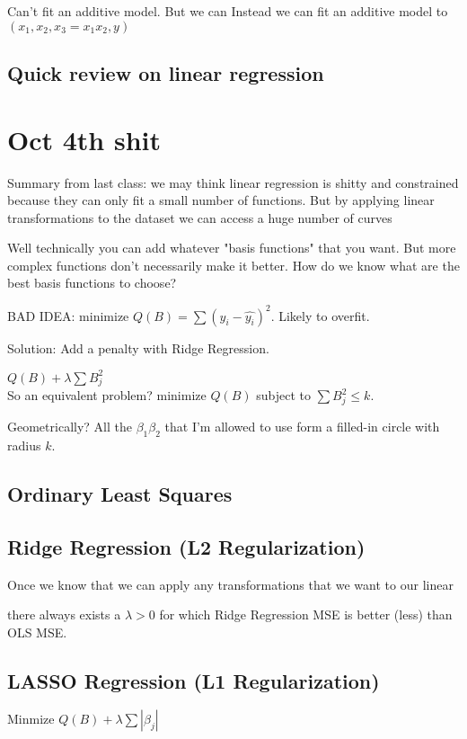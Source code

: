 \documentclass[12pt]{article}
\begin{document}
Can't fit an additive model. But we can Instead we can fit an additive model to $(x_1,x_2,x_3=x_1x_2, y)$

\subsection{Quick review on linear regression}

\section{Oct 4th shit}
Summary from last class: we may think linear regression is shitty and constrained because they can only fit a small number of functions. But by applying linear transformations to the dataset we can access a huge number of curves

Well technically you can add whatever "basis functions" that you want. But more complex functions don't necessarily make it better. How do we know what are the best basis functions to choose?

BAD IDEA: minimize $Q(B) = \sum (y_i-\hat{y_i})^2 $. Likely to overfit.

Solution: Add a penalty with Ridge Regression.

$Q(B) + \lambda \sum B_j^2$ \\

So an equivalent problem? minimize $Q(B)$ subject to $\sum B_j^2 \leq k$.

Geometrically? All the $\beta_1 \beta_2$ that I'm allowed to use form a filled-in circle with radius $k$.

\subsection{Ordinary Least Squares}

\subsection{Ridge Regression (L2 Regularization)}
Once we know that we can apply any transformations that we want to our linear 

there always exists a $\lambda > 0$ for which Ridge Regression MSE is better (less) than OLS MSE.

\subsection{LASSO Regression (L1 Regularization)}
Minmize $Q(B) + \lambda \sum |\beta_j|$
\end{document}
